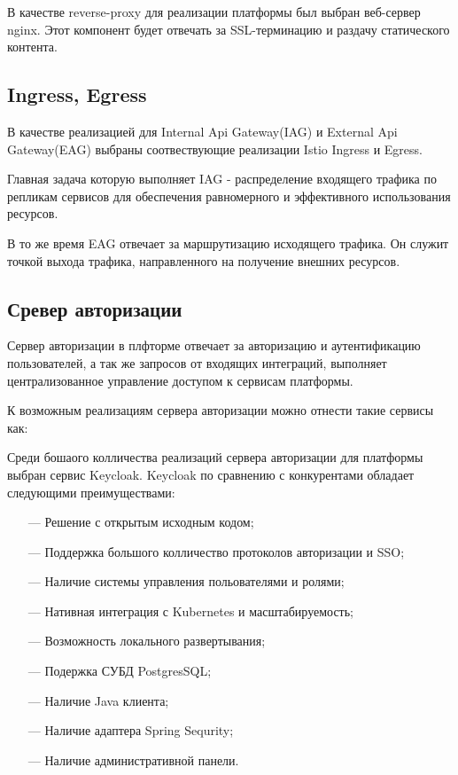 В качестве reverse-proxy для реализации платформы был выбран веб-сервер nginx. Этот компонент будет отвечать за SSL-терминацию и раздачу статического контента.

\subsection{Ingress, Egress}

В качестве реализацией для Internal Api Gateway(IAG) и External Api Gateway(EAG) выбраны соотвествующие реализации Istio Ingress и Egress.

Главная задача которую выполняет IAG - распределение входящего трафика по репликам сервисов для обеспечения равномерного и эффективного использования ресурсов.

В то же время EAG отвечает за маршрутизацию исходящего трафика. Он служит точкой выхода трафика, направленного на получение внешних ресурсов.

\subsection{Сревер авторизации}

Сервер авторизации в плфторме отвечает за авторизацию и аутентификацию пользователей, а так же запросов от входящих интеграций, выполняет централизованное управление доступом к сервисам платформы. 

К возможным реализациям сервера авторизации можно отнести такие сервисы как:

Среди бошаого колличества реализаций сервера авторизации для платформы выбран сервис Keycloak. Keycloak по сравнению с конкурентами обладает следующими преимуществами:

\begin{itemize}
  \item[---] Решение с открытым исходным кодом;
  \item[---] Поддержка большого колличество протоколов авторизации и SSO;
  \item[---] Наличие системы управления польователями и ролями;
  \item[---] Нативная интеграция с Kubernetes и масштабируемость;
  \item[---] Возможность локального развертывания;
  \item[---] Подержка СУБД PostgresSQL;
  \item[---] Наличие Java клиента;
  \item[---] Наличие адаптера Spring Sequrity;
  \item[---] Наличие административной панели. 
\end{itemize}

